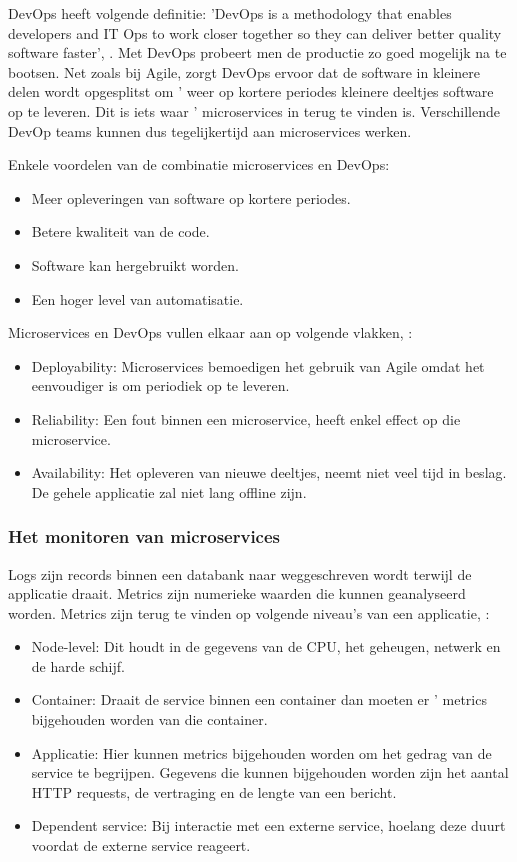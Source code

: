 DevOps heeft volgende definitie: 'DevOps is a methodology that enables developers and IT Ops to work closer together so they can deliver better quality software faster', \textcite{Morgan2019}. Met DevOps probeert men de productie zo goed mogelijk na te bootsen. Net zoals bij Agile, zorgt DevOps ervoor dat de software in kleinere delen wordt opgesplitst om '  weer op kortere periodes kleinere deeltjes software op te leveren. Dit is iets waar ' microservices in terug te vinden is. Verschillende DevOp teams kunnen dus tegelijkertijd aan microservices  werken.

Enkele voordelen van de combinatie microservices en DevOps:
\begin{itemize}
	\item Meer opleveringen van software op kortere periodes.
	\item Betere kwaliteit van de code.
	\item Software kan hergebruikt worden.
	\item Een hoger level van automatisatie.
\end{itemize}

Microservices en DevOps vullen elkaar aan op volgende vlakken, \textcite{Mulesoft2019}:
\begin{itemize}
	\item Deployability: Microservices bemoedigen het gebruik van Agile omdat het eenvoudiger is om periodiek op te leveren. 
	\item Reliability: Een fout binnen een microservice, heeft enkel effect op die microservice. 
	\item Availability: Het opleveren van nieuwe  deeltjes, neemt niet veel tijd in beslag. De gehele applicatie zal niet lang offline zijn.
\end{itemize}




\subsubsection{Het monitoren van microservices}
Logs zijn records binnen een databank naar weggeschreven wordt terwijl de applicatie draait. Metrics zijn numerieke waarden die kunnen geanalyseerd worden. Metrics zijn terug te vinden op volgende niveau's van een applicatie, \textcite{Wasson2018}:
\begin{itemize}
	\item Node-level: Dit houdt in de gegevens van de CPU, het geheugen, netwerk en de harde schijf. 
	\item Container: Draait de service binnen een container dan moeten er ' metrics bijgehouden worden van die container. 
	\item Applicatie: Hier kunnen metrics bijgehouden worden om het gedrag van de service te begrijpen. Gegevens die kunnen bijgehouden worden zijn het aantal HTTP requests, de vertraging en de lengte van een bericht.
	\item Dependent service: Bij interactie met een externe service, hoelang deze duurt voordat de externe service reageert. 
\end{itemize}


